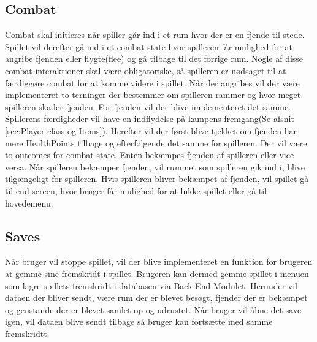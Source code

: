 \subsection{Combat}
\label{sec:Combat-design}
Combat skal initieres når spiller går ind i et rum hvor der er en fjende til stede. Spillet vil derefter gå ind i et combat state hvor spilleren får mulighed for at angribe fjenden eller flygte(flee) og gå tilbage til det forrige rum. Nogle af disse combat interaktioner skal være obligatoriske, så spilleren er nødsaget til at færdiggøre combat for at komme videre i spillet. Når der angribes vil der være implementeret to terninger der bestemmer om spilleren rammer og hvor meget spilleren skader fjenden. For fjenden vil der blive implementeret det samme. Spillerens færdigheder vil have en indflydelse på kampens fremgang(Se afsnit \autoref{sec:Player class og Items}). Herefter vil der først blive tjekket om fjenden har mere HealthPoints tilbage og efterfølgende det samme for spilleren. Der vil være to outcomes for combat state. Enten bekæmpes fjenden af spilleren eller vice versa. Når spilleren bekæmper fjenden, vil rummet som spilleren gik ind i, blive tilgængeligt for spilleren. Hvis spilleren bliver bekæmpet af fjenden, vil spillet gå til end-screen, hvor bruger får mulighed for at lukke spillet eller gå til hovedemenu.

\subsection{Saves}
Når bruger vil stoppe spillet, vil der blive implementeret en funktion for brugeren at gemme sine fremskridt i spillet. Brugeren kan dermed gemme spillet i menuen som lagre spillets fremskridt i databasen via Back-End Modulet. Herunder vil dataen der bliver sendt, være rum der er blevet besøgt, fjender der er bekæmpet og genstande der er blevet samlet op og udrustet. Når bruger vil åbne det save igen, vil dataen blive sendt tilbage så bruger kan fortsætte med samme fremskridtt.